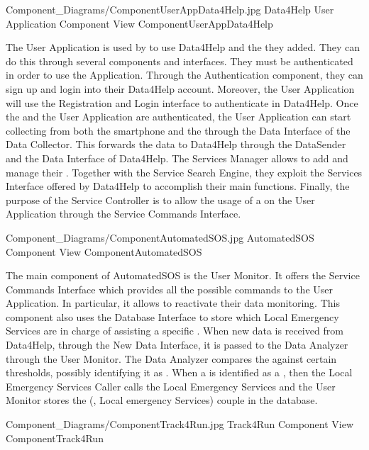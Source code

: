 \documentclass[../../DD.tex]{subfiles}
\begin{document}
	\image {13cm} {Component_Diagrams/ComponentUserAppData4Help.jpg} {Data4Help User Application Component View} {ComponentUserAppData4Help}

	The User Application is used by  to use Data4Help and the  they added. They can do this through several components and interfaces. They must be authenticated in order to use the Application. Through the Authentication component, they can sign up and login into their Data4Help account. Moreover, the User Application will use the Registration and Login interface to authenticate in Data4Help. Once the  and the User Application are authenticated, the User Application can start collecting  from both the smartphone and the  through the Data Interface of the Data Collector. This forwards the data to Data4Help through the DataSender and the Data Interface of Data4Help.
	The Services Manager allows  to add and manage their . Together with the Service Search Engine, they exploit the Services Interface offered by Data4Help to accomplish their main functions.
	Finally, the purpose of the Service Controller is to allow the usage of a  on the User Application through the Service Commands Interface.

	\image {13cm} {Component_Diagrams/ComponentAutomatedSOS.jpg} {AutomatedSOS Component View} {ComponentAutomatedSOS}

	The main component of AutomatedSOS is the User Monitor. It offers the Service Commands Interface which provides all the possible commands to the User Application. In particular, it allows  to reactivate their data monitoring. This component also uses the Database Interface to store which Local Emergency Services are in charge of assisting a specific .
	When new data is received from Data4Help, through the New Data Interface, it is passed to the Data Analyzer through the User Monitor. The Data Analyzer compares the  against certain thresholds, possibly identifying it as . When a  is identified as a , then the Local Emergency Services Caller calls the Local Emergency Services and the User Monitor stores the (, Local emergency Services) couple in the database.

	\image {13cm} {Component_Diagrams/ComponentTrack4Run.jpg} {Track4Run Component View} {ComponentTrack4Run}
\end{document}
